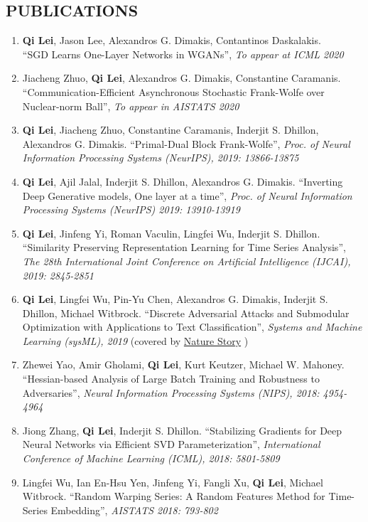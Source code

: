 \documentclass[margin, 10pt]{res} %
\begin{document}
\begin{resume}
\section{PUBLICATIONS}
\begin{enumerate}
\item{\textbf{Qi Lei}, Jason Lee, Alexandros G. Dimakis, Contantinos Daskalakis. \\ ``SGD Learns One-Layer Networks in WGANs'', \textit{To appear at ICML 2020}}
  \item{Jiacheng Zhuo, \textbf{Qi Lei}, Alexandros G. Dimakis, Constantine 
      Caramanis.\\ ``Communication-Efficient Asynchronous Stochastic 
    Frank-Wolfe over Nuclear-norm Ball'', \textit{To appear in AISTATS 2020} }
  \item{ \textbf{Qi Lei}, Jiacheng Zhuo, Constantine Caramanis, Inderjit S. 
    Dhillon, Alexandros G. Dimakis. ``Primal-Dual Block Frank-Wolfe'', 
  \textit{Proc. of Neural Information Processing Systems (NeurIPS), 2019: 13866-13875} }
  \item{ \textbf{Qi Lei}, Ajil Jalal, Inderjit S. Dhillon, Alexandros G. 
      Dimakis. ``Inverting Deep Generative models, One layer at a time'', 
    \textit{Proc. of Neural Information Processing Systems (NeurIPS) 2019: 13910-13919} }

  \item{ \textbf{Qi Lei}, Jinfeng Yi, Roman Vaculin, Lingfei Wu, Inderjit S. 
      Dhillon. ``Similarity Preserving Representation Learning for Time Series 
      Analysis'', \textit{The 28th International Joint Conference on Artificial 
    Intelligence (IJCAI), 2019: 2845-2851}}
  \item{\textbf{Qi Lei}, Lingfei Wu, Pin-Yu Chen, Alexandros G. Dimakis, Inderjit S. 
    Dhillon, Michael Witbrock. ``Discrete Adversarial Attacks and Submodular 
    Optimization with Applications to Text Classification'', \textit{Systems and Machine 
  Learning (sysML), 2019} (covered by \href{https://www.nature.com/articles/d41586-019-01510-1}{Nature Story} )   }
\item{Zhewei Yao, Amir Gholami, \textbf{Qi Lei}, Kurt Keutzer, Michael W. 
  Mahoney. ``Hessian-based Analysis of Large Batch Training and Robustness to 
Adversaries'', \textit{Neural Information Processing Systems (NIPS), 2018: 4954-4964}}
  \item{Jiong Zhang, \textbf{Qi Lei}, Inderjit S. Dhillon. 
        ``Stabilizing Gradients for Deep 
       Neural Networks via Efficient SVD Parameterization'', \textit{
    International Conference of Machine Learning (ICML), 2018: 5801-5809}}
  \item{Lingfei Wu, Ian En-Hsu Yen, Jinfeng Yi, Fangli Xu, \textbf{Qi Lei}, Michael Witbrock.
    ``Random Warping Series: A Random Features Method for Time-Series Embedding'', \textit{AISTATS 2018: 793-802}}


\end{enumerate}
\end{resume}
\end{document}
